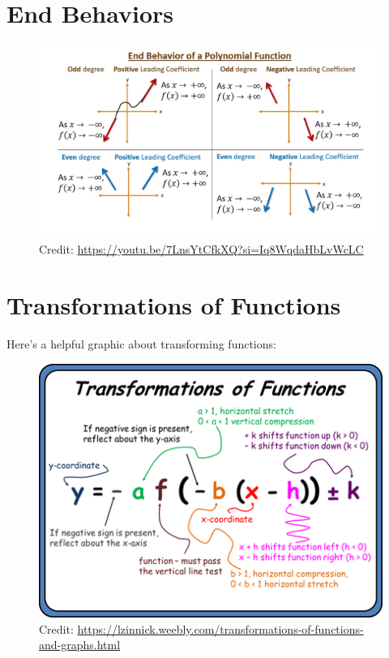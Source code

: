 \documentclass[12pt]{article}
\begin{document}
\section{End Behaviors}

\begin{figure}[H]
	\centering
	\includegraphics[scale=0.4]{maxresdefault.jpg}
	\caption{Credit: \url{https://youtu.be/7LnsYtCfkXQ?si=Iq8WqdaHbLvWcLC}}
\end{figure}

\section{Transformations of Functions}

Here's a helpful graphic about transforming functions:

\begin{figure}[H]
	\centering
	\includegraphics[scale=0.5]{9546920.png}
	\caption{Credit: \url{https://lzinnick.weebly.com/transformations-of-functions-and-graphs.html}}
\end{figure}
\end{document}
